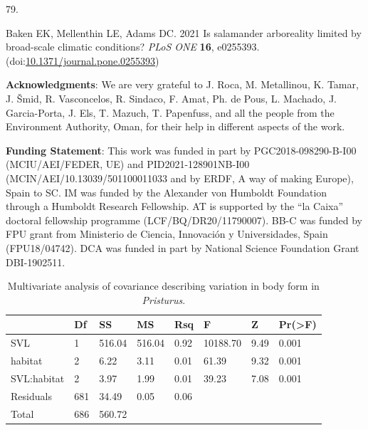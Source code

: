 \documentclass[
  11pt,
]{article}
\newlength{\cslhangindent}
\newlength{\csllabelwidth}
\newlength{\cslentryspacingunit} %
\newenvironment{CSLReferences}[2] %
 {%
  \setlength{\parindent}{0pt}
  \ifodd #1
  \let\oldpar\par
  \def\par{\hangindent=\cslhangindent\oldpar}
  \fi
  \setlength{\parskip}{#2\cslentryspacingunit}
 }%
 {}
\newcommand{\CSLLeftMargin}[1]{\parbox[t]{\csllabelwidth}{#1}}
\newcommand{\CSLRightInline}[1]{\parbox[t]{\linewidth - \csllabelwidth}{#1}\break}
\begin{document}
\begin{CSLReferences}{0}{0}
\leavevmode{}%
\CSLLeftMargin{79. }%
\CSLRightInline{Baken EK, Mellenthin LE, Adams DC. 2021 Is salamander
arboreality limited by broad-scale climatic conditions? \emph{PLoS ONE}
\textbf{16}, e0255393.
(doi:\href{https://doi.org/10.1371/journal.pone.0255393}{10.1371/journal.pone.0255393})}

\end{CSLReferences}

\newpage

\hfill\break

\textbf{Acknowledgments}: We are very grateful to J. Roca, M.
Metallinou, K. Tamar, J. Šmid, R. Vasconcelos, R. Sindaco, F. Amat, Ph.
de Pous, L. Machado, J. Garcia-Porta, J. Els, T. Mazuch, T. Papenfuss,
and all the people from the Environment Authority, Oman, for their help
in different aspects of the work.

\textbf{Funding Statement}: This work was funded in part by
PGC2018-098290-B-I00 (MCIU/AEI/FEDER, UE) and PID2021-128901NB-I00
(MCIN/AEI/10.13039/501100011033 and by ERDF, A way of making Europe),
Spain to SC. IM was funded by the Alexander von Humboldt Foundation
through a Humboldt Research Fellowship. AT is supported by the ``la
Caixa'' doctoral fellowship programme (LCF/BQ/DR20/11790007). BB-C was
funded by FPU grant from Ministerio de Ciencia, Innovación y
Universidades, Spain (FPU18/04742). DCA was funded in part by National
Science Foundation Grant DBI-1902511.

\newpage

\begin{table}[H]

\caption{\label{tab:unnamed-chunk-1}Multivariate analysis of covariance describing variation in body form in \textit{Pristurus}.}
\centering
\begin{tabular}[t]{llllllll}
\toprule
  & Df & SS & MS & Rsq & F & Z & Pr(>F)\\
\midrule
SVL & 1 & 516.04 & 516.04 & 0.92 & 10188.70 & 9.49 & 0.001\\
habitat & 2 & 6.22 & 3.11 & 0.01 & 61.39 & 9.32 & 0.001\\
SVL:habitat & 2 & 3.97 & 1.99 & 0.01 & 39.23 & 7.08 & 0.001\\
Residuals & 681 & 34.49 & 0.05 & 0.06 &  &  & \\
Total & 686 & 560.72 &  &  &  &  & \\
\bottomrule
\end{tabular}
\end{table}
\end{document}

